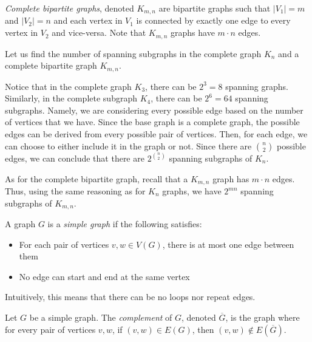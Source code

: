 \begin{definition}
  \textit{Complete bipartite graphs}, denoted \(K_{m, n}\) are bipartite graphs such that \(|V_1| = m\) and \(|V_2| = n\) and each vertex in \(V_1\) is
  connected by exactly one edge to every vertex in \(V_2\) and vice-versa. Note
  that \(K_{m, n}\) graphs have \(m \cdot n \) edges.
\end{definition}

\begin{nexample}
  Let us find the number of spanning subgraphs in the complete graph \(K_n\) and a complete bipartite graph \(K_{m, n}\).

  Notice that in the complete graph \(K_3\), there can be \(2^3 = 8\) spanning graphs.
  Similarly, in the complete subgraph \(K_4\), there can be 
  \(2^6 = 64\) spanning subgraphs. Namely, we are considering every possible
  edge based on the number of vertices that we have. Since the base graph is a complete graph, the possible edges can be derived from every possible pair of vertices. Then, for each edge, we can choose to
  either include it in the graph or not. Since there are \(\binom{n}{2}\)
  possible edges, we can conclude that there are \(2^{\binom{n}{2}}\) spanning subgraphs of \(K_n\).

  As for the complete bipartite graph, recall that a \(K_{m, n}\) graph has
  \(m \cdot n\) edges. Thus, using the same reasoning as for \(K_n\) graphs, we have \(2^{mn}\) spanning subgraphs of \(K_{m, n}\).
\end{nexample}

\begin{definition}
  A graph \(G\) is a \textit{simple graph} if the following satisfies:
  \begin{itemize}
    \item For each pair of vertices \(v, w \in V(G)\), there is at most one edge
      between them
    \item No edge can start and end at the same vertex
  \end{itemize}
  Intuitively, this means that there can be no loops nor repeat edges.
\end{definition}

\begin{definition}
  Let \(G\) be a simple graph. The \textit{complement} of \(G\), denoted
  \(\overline{G}\), is the graph where for every pair of vertices \(v, w\), if
  \((v, w) \in E(G)\), then \((v, w) \notin E(\overline{G})\).
\end{definition}


